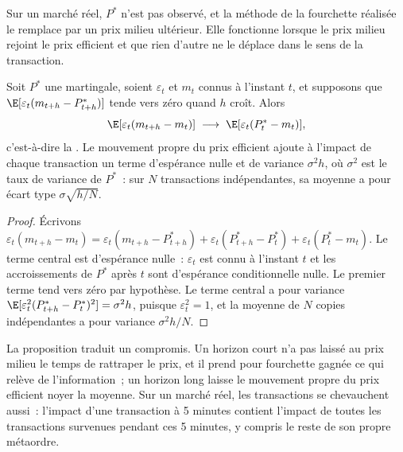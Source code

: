 Sur un marché réel, $P^\ast$ n'est pas observé, et la méthode de la fourchette réalisée le remplace par un prix milieu ultérieur. Elle fonctionne lorsque le prix milieu rejoint le
prix efficient et que rien d'autre ne le déplace dans le sens de la transaction.

\begin{proposition}\label{prop:mx:decomposing-the-spread:converge}
Soit $P^\ast$ une martingale, soient $\varepsilon_t$ et $m_t$ connus à l'instant $t$, et supposons que $\E[\varepsilon_t(m_{t+h}-P^\ast_{t+h})]$ tende vers zéro quand $h$ croît. Alors
\[
\E[\varepsilon_t(m_{t+h}-m_t)]\;\longrightarrow\;\E[\varepsilon_t(P^\ast_t-m_t)],
\]
c'est-à-dire la . Le mouvement propre du prix efficient ajoute à l'impact de chaque transaction un terme d'espérance nulle et de variance $\sigma^2h$, où
$\sigma^2$ est le taux de variance de $P^\ast$~: sur $N$ transactions indépendantes, sa moyenne a pour écart type $\sigma\sqrt{h/N}$.
\end{proposition}

\begin{proof}
Écrivons $\varepsilon_t(m_{t+h}-m_t)=\varepsilon_t(m_{t+h}-P^\ast_{t+h})+\varepsilon_t(P^\ast_{t+h}-P^\ast_t)+\varepsilon_t(P^\ast_t-m_t)$. Le terme central est
d'espérance nulle~: $\varepsilon_t$ est connu à l'instant $t$ et les accroissements de $P^\ast$ après $t$ sont d'espérance conditionnelle nulle. Le premier terme tend vers zéro par hypothèse. Le terme central
a pour variance $\E[\varepsilon_t^2(P^\ast_{t+h}-P^\ast_t)^2]=\sigma^2h$, puisque $\varepsilon_t^2=1$, et la moyenne de $N$ copies indépendantes a pour variance
$\sigma^2h/N$.
\end{proof}

La proposition traduit un compromis. Un horizon court n'a pas laissé au prix milieu le temps de rattraper le prix, et il prend pour fourchette gagnée ce qui relève de l'information~; un horizon long laisse le
mouvement propre du prix efficient noyer la moyenne. Sur un marché réel, les transactions se chevauchent aussi~: l'impact d'une transaction à 5 minutes contient l'impact de toutes les transactions survenues pendant ces
5 minutes, y compris le reste de son propre métaordre.

